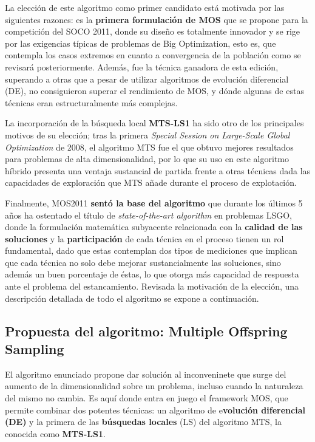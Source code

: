 La elección de este algoritmo como primer candidato está motivada por las siguientes razones: es la \textbf{primera formulación de MOS} que se propone para la competición del SOCO 2011, donde su diseño es totalmente innovador y se rige por las exigencias típicas de problemas de Big Optimization, esto es, que contempla los casos extremos en cuanto a convergencia de la población como se revisará posteriormente. Además, fue la técnica ganadora de esta edición, superando a otras que a pesar de utilizar algoritmos de evolución diferencial (DE), no consiguieron superar el rendimiento de MOS, y dónde algunas de estas técnicas eran estructuralmente más complejas.

La incorporación de la búsqueda local \textbf{MTS-LS1} ha sido otro de los principales motivos de su elección; tras la primera \textit{Special Session on Large-Scale Global Optimization} de 2008, el algoritmo MTS fue el que obtuvo mejores resultados para problemas de alta dimensionalidad, por lo que su uso en este algoritmo híbrido presenta una ventaja sustancial de partida frente a otras técnicas dada las capacidades de exploración que MTS añade durante el proceso de explotación.

Finalmente, MOS2011 \textbf{sentó la base del algoritmo} que durante los últimos 5 años ha ostentado el título de \textit{state-of-the-art algorithm} en problemas LSGO, donde la formulación matemática subyacente relacionada con la \textbf{calidad de las soluciones} y la \textbf{participación} de cada técnica en el proceso tienen un rol fundamental, dado que estas contemplan dos tipos de mediciones que implican que cada técnica no solo debe mejorar sustancialmente las soluciones, sino además un buen porcentaje de éstas, lo que otorga más capacidad de respuesta ante el problema del estancamiento. Revisada la motivación de la elección, una descripción detallada de todo el algoritmo se expone a continuación.

\subsection{Propuesta del algoritmo: Multiple Offspring Sampling}

El algoritmo enunciado propone dar solución al inconveninete que surge del aumento de la dimensionalidad sobre un problema, incluso cuando la naturaleza del mismo no cambia. Es aquí donde entra en juego el framework MOS, que permite combinar dos potentes técnicas: un algoritmo de e\textbf{volución diferencial (DE)} y la primera de las \textbf{búsquedas locales} (LS) del algoritmo MTS, la conocida como \textbf{MTS-LS1}\cite{MTS-LSGO}.

